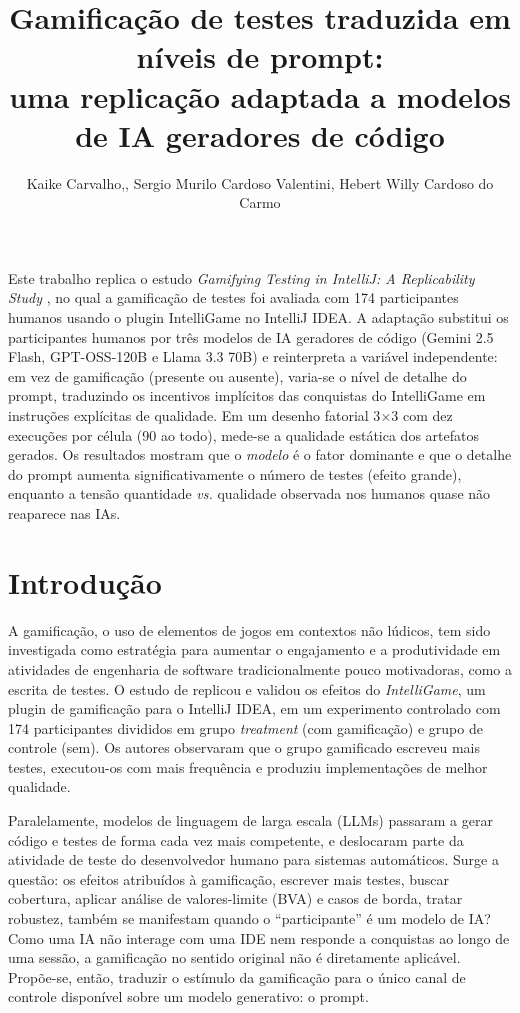 \documentclass[12pt]{article}
\title{Gamificação de testes traduzida em níveis de prompt:\\ uma replicação
  adaptada a modelos de IA geradores de código}
\author{Kaike Carvalho,\inst{1}, Sergio Murilo Cardoso Valentini\inst{2}, Hebert Willy Cardoso do Carmo\inst{3}}
\begin{document}
\maketitle

\begin{resumo}
  Este trabalho replica o estudo \emph{Gamifying Testing in IntelliJ: A
  Replicability Study} \cite{straubinger2025}, no qual a gamificação de testes
  foi avaliada com 174 participantes humanos usando o plugin IntelliGame no
  IntelliJ IDEA. A adaptação substitui os participantes humanos por três modelos
  de IA geradores de código (Gemini 2.5 Flash, GPT-OSS-120B e Llama 3.3 70B) e
  reinterpreta a variável independente: em vez de gamificação (presente ou
  ausente), varia-se o nível de detalhe do prompt, traduzindo os incentivos
  implícitos das conquistas do IntelliGame em instruções explícitas de
  qualidade. Em um desenho fatorial 3$\times$3 com dez execuções por célula (90
  ao todo), mede-se a qualidade estática dos artefatos gerados. Os resultados
  mostram que o \emph{modelo} é o fator dominante e que o detalhe do prompt
  aumenta significativamente o número de testes (efeito grande), enquanto a
  tensão quantidade \emph{vs.} qualidade observada nos humanos quase não
  reaparece nas IAs.
\end{resumo}

\section{Introdução}

A gamificação, o uso de elementos de jogos em contextos não lúdicos, tem
sido investigada como estratégia para aumentar o engajamento e a produtividade
em atividades de engenharia de software tradicionalmente pouco motivadoras,
como a escrita de testes. O estudo de \cite{straubinger2025} replicou e validou
os efeitos do \emph{IntelliGame}, um plugin de gamificação para o IntelliJ
IDEA, em um experimento controlado com 174 participantes divididos em grupo
\emph{treatment} (com gamificação) e grupo de controle (sem). Os autores
observaram que o grupo gamificado escreveu mais testes, executou-os com mais
frequência e produziu implementações de melhor qualidade.

Paralelamente, modelos de linguagem de larga escala (LLMs) passaram a gerar código e
testes de forma cada vez mais competente, e deslocaram parte da atividade de
teste do desenvolvedor humano para sistemas automáticos. Surge a questão: os
efeitos atribuídos à gamificação, escrever mais testes, buscar cobertura,
aplicar análise de valores-limite (BVA) e casos de borda, tratar robustez,
também se manifestam quando o ``participante'' é um modelo de IA? Como uma IA
não interage com uma IDE nem responde a conquistas ao longo de uma sessão, a
gamificação no sentido original não é diretamente aplicável. Propõe-se, então,
traduzir o estímulo da gamificação para o único canal de controle disponível
sobre um modelo generativo: o prompt.
\end{document}

